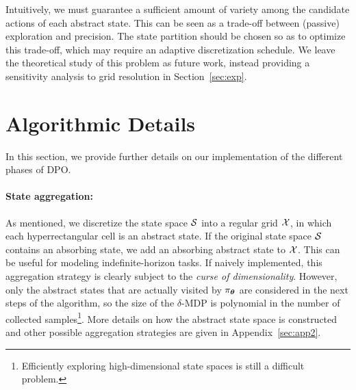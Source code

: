 %
Intuitively, we must guarantee a sufficient amount of variety among the candidate actions of each abstract state. This can be seen as a trade-off between (passive) exploration and precision. The state partition should be chosen so as to optimize this trade-off, which may require an adaptive discretization schedule. We leave the theoretical study of this problem as future work, instead providing a sensitivity analysis to grid resolution in Section~\ref{sec:exp}.



\section{Algorithmic Details}\label{sec:detail}
In this section, we provide further details on our implementation of the different phases of DPO.

\paragraph{State aggregation:}
As mentioned, we discretize the state space $\mathcal{S}$ into a regular grid $\mathcal{X}$, in which each hyperrectangular cell is an abstract state. 
If the original state space $\mathcal{S}$ contains an absorbing state, we add an absorbing abstract state to $\mathcal{X}$. This can be useful for modeling indefinite-horizon tasks.
If naively implemented, this aggregation strategy is clearly subject to the \textit{curse of dimensionality}. However, only the abstract states that are actually visited by $\pi_{\boldsymbol{\theta}}$ are considered in the next steps of the algorithm, so the size of the $\delta$-MDP is polynomial in the number of collected samples\footnote{Efficiently exploring high-dimensional state spaces is still a difficult problem.}.  
More details on how the abstract state space is constructed and other possible aggregation strategies are given in Appendix~\ref{sec:app2}.


